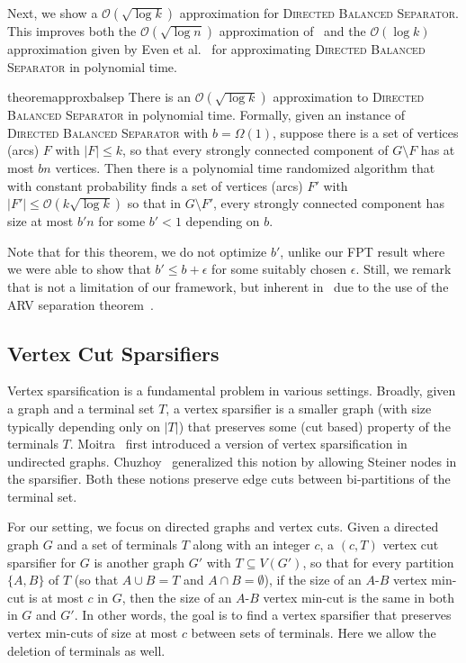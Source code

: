 \documentclass[11pt]{article}
\newcommand{\OO}{\mathcal{O}}
\newcommand{\DB}{{\textsc{Directed Balanced Separator}}}
\begin{document}
Next, we show a $\OO(\sqrt{\log k})$ approximation for \DB. This improves both the $\OO(\sqrt{\log n})$ approximation  of~\cite{agarwal2005log} and the $\OO(\log k)$ approximation given by Even et al.~\cite{even1999fast} for approximating \DB{} in polynomial time. 


\begin{restatable}{theorem}{approxbalsep}
There is an $\OO(\sqrt{\log k})$ approximation to \DB{} in polynomial time. Formally, given an instance of \DB{} with $b = \Omega(1)$, suppose there is a set of vertices (arcs) $F$ with $|F| \leq k$, so that every strongly connected component of $G \setminus F$ has at most $bn$ vertices. Then there is a polynomial time randomized algorithm that with constant probability finds a set of vertices (arcs) $F'$ with $|F'| \leq \OO(k\sqrt{\log k})$ so that in $G \setminus F'$, every strongly connected component has size at most $b'n$ for some $b' < 1$ depending on $b$.
\label{thm:approxbalsep}
\end{restatable}

Note that for this theorem, we do not optimize $b'$, unlike our FPT result where we were able to show that $b' \leq b + \epsilon$ for some suitably chosen $\epsilon$. Still, we remark that is not a limitation of our framework, but inherent in~\cite{agarwal2005log} due to the use of the ARV separation theorem~\cite{arora2009expander}.

\subsection{Vertex Cut Sparsifiers}
Vertex sparsification is a fundamental problem in various settings. Broadly, given a graph and a terminal set $T$, a vertex sparsifier is a smaller graph (with size typically depending only on $|T|$) that preserves some (cut based) property of the terminals $T$. Moitra~\cite{moitra2009approximation} first introduced a version of vertex sparsification in undirected graphs. Chuzhoy~\cite{chuzhoy2012vertex} generalized this notion by allowing Steiner nodes in the sparsifier. Both these notions preserve edge cuts between bi-partitions of the terminal set.


For our setting, we focus on directed graphs and vertex cuts. Given a directed graph $G$ and a set of terminals $T$ along with an integer $c$, a $(c,T)$ vertex cut sparsifier for $G$ is another graph $G'$ with $T \subseteq V(G')$, so that for every partition $\{A, B\}$ of $T$ (so that $A \cup B = T$ and $A \cap B = \emptyset$), if the size of an $A$-$B$ vertex min-cut is at most $c$ in $G$, then the size of an $A$-$B$ vertex min-cut is the same in both in $G$ and $G'$. In other words, the goal is to find a vertex sparsifier that preserves vertex min-cuts of size at most $c$ between sets of terminals. Here we allow the deletion of terminals as well.
\end{document}
